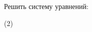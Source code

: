 \begin{ex}[type=multi]
	\begin{condition}
		Решить систему уравнений:
		\begin{tasks}(2)
			\task {}
			\task {}
			\task {}
			\task {}
			\task {}
			\task {}
			\task {}
			\task {}
		\end{tasks}
	\end{condition}
\end{ex}